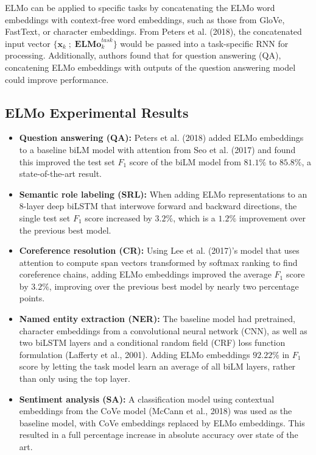 ELMo can be applied to specific tasks by concatenating the ELMo word embeddings with context-free word embeddings, such as those from GloVe, FastText, or character embeddings. From Peters et al. (2018), the concatenated input vector $\Big\{ \mathbf{x}_k \; ; \; \textbf{ELMo}_k^{task} \Big\}$ would be passed into a task-specific RNN for processing. Additionally, authors found that for question answering (QA), concatening ELMo embeddings with outputs of the question answering model could improve performance. 

\subsection{ELMo Experimental Results} \label{sec:ResultsELMo}

\begin{itemize}
    \item  \textbf{Question answering (QA): } Peters et al. (2018) added ELMo embeddings to a baseline biLM model with attention from Seo et al. (2017) and found this improved the test set $F_1$ score of the biLM model from $81.1 \%$ to $85.8 \%$, a state-of-the-art result. 

    \item \textbf{Semantic role labeling (SRL): } When adding ELMo representations to an 8-layer deep biLSTM that interwove forward and backward directions, the single test set $F_1$ score increased by $3.2 \%$, which is a $1.2 \%$ improvement over the previous best model. 
    
    \item \textbf{Coreference resolution (CR): } Using Lee et al. (2017)'s model that uses attention to compute span vectors transformed by softmax ranking to find coreference chains, adding ELMo embeddings improved the average $F_1$ score by $3.2 \%$, improving over the previous best model by nearly two percentage points. 
    
    \item \textbf{Named entity extraction (NER): } The baseline model had pretrained, character embeddings from a convolutional neural network (CNN), as well as two biLSTM layers and a conditional random field (CRF) loss function formulation (Lafferty et al., 2001). Adding ELMo embeddings $92.22 \%$ in $F_1$ score by letting the task model learn an average of all biLM layers, rather than only using the top layer. 
    
    \item \textbf{Sentiment analysis (SA): } A classification model using contextual embeddings from the CoVe model (McCann et al., 2018) was used as the baseline model, with CoVe embeddings replaced by ELMo embeddings. This resulted in a full percentage increase in absolute accuracy over state of the art. 
\end{itemize}


